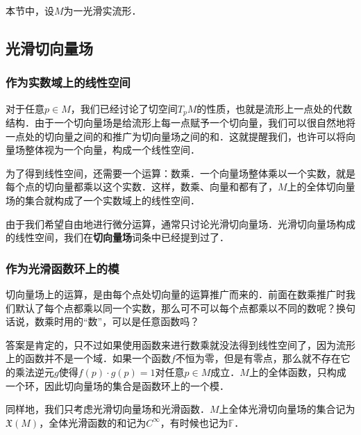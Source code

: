 

本节中，设$M$为一光滑实流形．

\subsection{光滑切向量场}

\subsubsection{作为实数域上的线性空间}

对于任意$p\in M$，我们已经讨论了切空间$T_pM$的性质，也就是流形上一点处的代数结构．由于一个切向量场是给流形上每一点赋予一个切向量，我们可以很自然地将一点处的切向量之间的和推广为切向量场之间的和．这就提醒我们，也许可以将向量场整体视为一个向量，构成一个线性空间．

为了得到线性空间，还需要一个运算：数乘．一个向量场整体乘以一个实数，就是每个点的切向量都乘以这个实数．这样，数乘、向量和都有了，$M$上的全体切向量场的集合就构成了一个实数域上的线性空间．

由于我们希望自由地进行微分运算，通常只讨论光滑切向量场．光滑切向量场构成的线性空间，我们在\textbf{切向量场}词条中已经提到过了．

\subsubsection{作为光滑函数环上的模}

切向量场上的运算，是由每个点处切向量的运算推广而来的．前面在数乘推广时我们默认了每个点都乘以同一个实数，那么可不可以每个点都乘以不同的数呢？换句话说，数乘时用的“数”，可以是任意函数吗？

答案是肯定的，只不过如果使用函数来进行数乘就没法得到线性空间了，因为流形上的函数并不是一个域．如果一个函数$f$不恒为零，但是有零点，那么就不存在它的乘法逆元$g$使得$f(p)\cdot g(p)=1$对任意$p\in M$成立．$M$上的全体函数，只构成一个环，因此切向量场的集合是函数环上的一个模．

同样地，我们只考虑光滑切向量场和光滑函数．$M$上全体光滑切向量场的集合记为$\mathfrak{X}(M)$，全体光滑函数的和记为$C^{\infty}$，有时候也记为$\mathbb{F}$．








